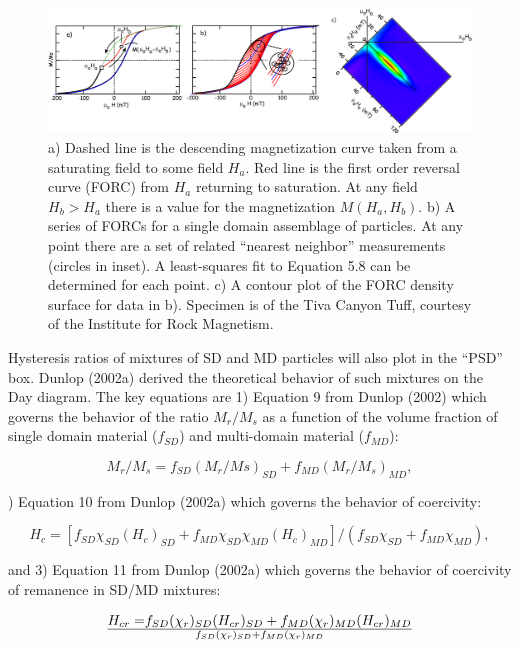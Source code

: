 \begin{figure}[h!tb]
\centering  \includegraphics[width=14 cm]{EPSfiles/forcprinc.eps}
\caption{a) Dashed line is the descending magnetization curve taken from a saturating field to some field $H_a$.  Red line is the first order reversal curve (FORC) from $H_a$ returning to saturation.   At any field $H_b>H_a$ there is a value for the magnetization $M(H_a,H_b)$.  b) A series of FORCs for a single domain assemblage of particles.  At any point  there are a set of related ``nearest neighbor'' measurements (circles in inset).  A least-squares fit to Equation 5.8 can be determined for each point.    c) A contour plot of the FORC density surface for data in b).   Specimen is  of the Tiva Canyon Tuff, courtesy of the Institute for Rock Magnetism.   }
\label{fig:forcprinc}
\end{figure}


Hysteresis ratios of mixtures of SD and MD particles will also plot in the ``PSD'' box.  Dunlop (2002a) derived the theoretical behavior of such mixtures on the Day diagram.    The key equations are 1) Equation 9 from Dunlop (2002) which governs the behavior of the ratio $M_r/M_s$ as a function of the volume fraction of single domain material ($f_{SD}$) and multi-domain material ($f_{MD}$): 

$$
{M_r/M_s} = f_{SD} (M_r/Ms)_{SD} + f_{MD} (M_r/M_s)_{MD}, 
$$

) Equation 10 from Dunlop (2002a) which governs the behavior of coercivity:

$$
H_c = [f_{SD} \chi_{SD} (H_c)_{SD} + f_{MD} \chi_{SD} \chi_{MD} (H_c)_{MD}] / (f_{SD} \chi_{SD} + f_{MD} \chi_{MD}), 
$$

\noindent and 3) Equation 11 from Dunlop (2002a) which governs the behavior of coercivity of remanence in SD/MD mixtures:

$$
{H_{cr} =}  {  f_{SD}( \chi_r)_{SD} (H_{cr})_{SD} +  f_{MD}( \chi_r)_{MD} (H_{cr})_{MD} } \over { f_{SD} (\chi_r)_{SD} + f_{MD} (\chi_r)_{MD} }
$$

